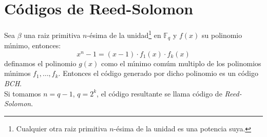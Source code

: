 %
%

\section{C\'odigos de Reed-Solomon}

Sea $\beta$ una raiz primitiva $n$-\'esima de la unidad\footnote{Cualquier otra
raiz primitiva $n$-\'esima de la unidad es una potencia suya.} en 
$\mathbb{F}_q$ y $f(x)$ su polinomio m\'{\i}nimo, entonces:
\begin{displaymath}
x^n-1=(x-1)\cdot f_1(x)\cdot f_k(x)
\end{displaymath}
definamos el polinomio $g(x)$ como el m\'{\i}nimo com\'um multiplo de los
polinomios m\'{\i}nimos $f_1,\dots,f_k$. Entonces el c\'odigo generado por
dicho polinomio es un c\'odigo \emph{BCH}.\\

Si tomamos $n=q-1$, $q=2^k$, el c\'odigo resultante se llama c\'odigo de
\emph{Reed-Solomon}.
